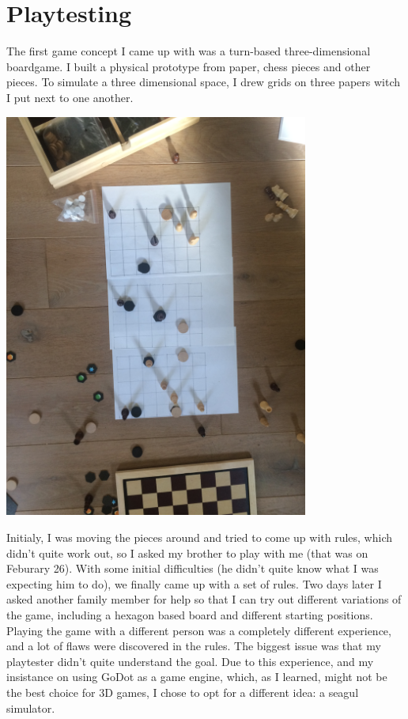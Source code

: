 \documentclass{article}
\begin{document}
\section{Playtesting}
The first game concept I came up with was a turn-based three-dimensional boardgame. I built a physical prototype from paper, chess pieces and other pieces. To simulate a three dimensional space, I drew grids on three papers witch I put next to one another. 

\includegraphics[width=10cm]{prototype}

Initialy, I was moving the pieces around and tried to come up with rules, which didn't quite work out, so I asked my brother to play with me (that was on Feburary 26). With some initial difficulties (he didn't quite know what I was expecting him to do), we finally came up with a set of rules. Two days later I asked another family member for help so that I can try out different variations of the game, including a hexagon based board and different starting positions. Playing the game with a different person was a completely different experience, and a lot of flaws were discovered in the rules. The biggest issue was that my playtester didn't quite understand the goal. Due to this experience, and my insistance on using GoDot as a game engine, which, as I learned, might not be the best choice for 3D games, I chose to opt for a different idea: a seagul simulator.
\end{document}
